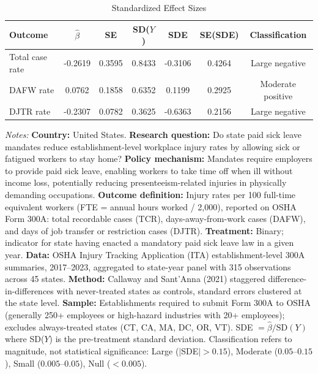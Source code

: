 \begin{table}[t]
\centering
\caption{Standardized Effect Sizes}
\label{tab:sde}
\begin{tabular}{lcccccc}
\toprule
Outcome & $\hat{\beta}$ & SE & SD($Y$) & SDE & SE(SDE) & Classification \\
\midrule
Total case rate & -0.2619 & 0.3595 & 0.8433 & -0.3106 & 0.4264 & Large negative \\
DAFW rate & 0.0762 & 0.1858 & 0.6352 & 0.1199 & 0.2925 & Moderate positive \\
DJTR rate & -0.2307 & 0.0782 & 0.3625 & -0.6363 & 0.2156 & Large negative \\
\bottomrule
\end{tabular}
\begin{tablenotes}
\small
\item \textit{Notes:} \textbf{Country:} United States. \textbf{Research question:} Do state paid sick leave mandates reduce establishment-level workplace injury rates by allowing sick or fatigued workers to stay home? \textbf{Policy mechanism:} Mandates require employers to provide paid sick leave, enabling workers to take time off when ill without income loss, potentially reducing presenteeism-related injuries in physically demanding occupations. \textbf{Outcome definition:} Injury rates per 100 full-time equivalent workers (FTE = annual hours worked / 2,000), reported on OSHA Form 300A: total recordable cases (TCR), days-away-from-work cases (DAFW), and days of job transfer or restriction cases (DJTR). \textbf{Treatment:} Binary; indicator for state having enacted a mandatory paid sick leave law in a given year. \textbf{Data:} OSHA Injury Tracking Application (ITA) establishment-level 300A summaries, 2017--2023, aggregated to state-year panel with 315 observations across 45 states. \textbf{Method:} Callaway and Sant'Anna (2021) staggered difference-in-differences with never-treated states as controls, standard errors clustered at the state level. \textbf{Sample:} Establishments required to submit Form 300A to OSHA (generally 250+ employees or high-hazard industries with 20+ employees); excludes always-treated states (CT, CA, MA, DC, OR, VT). SDE $= \hat{\beta} / \text{SD}(Y)$ where SD($Y$) is the pre-treatment standard deviation. Classification refers to magnitude, not statistical significance: Large ($|$SDE$| > 0.15$), Moderate ($0.05$--$0.15$), Small ($0.005$--$0.05$), Null ($< 0.005$).
\end{tablenotes}
\end{table}
